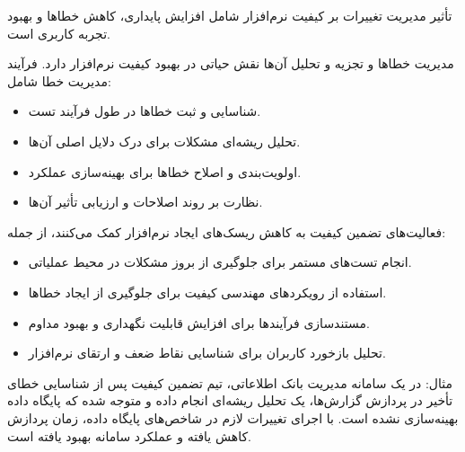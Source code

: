 تأثیر مدیریت تغییرات بر کیفیت نرم‌افزار شامل افزایش پایداری، کاهش خطاها و بهبود تجربه کاربری است.

{مدیریت خطاها و تجزیه و تحلیل آن‌ها} نقش حیاتی در بهبود کیفیت نرم‌افزار دارد. فرآیند مدیریت خطا شامل:
\begin{itemize}
    \item شناسایی و ثبت خطاها در طول فرآیند تست.
    \item تحلیل ریشه‌ای مشکلات برای درک دلایل اصلی آن‌ها.
    \item اولویت‌بندی و اصلاح خطاها برای بهینه‌سازی عملکرد.
    \item نظارت بر روند اصلاحات و ارزیابی تأثیر آن‌ها.
\end{itemize}

فعالیت‌های تضمین کیفیت به کاهش ریسک‌های ایجاد نرم‌افزار کمک می‌کنند، از جمله:
\begin{itemize}
    \item انجام تست‌های مستمر برای جلوگیری از بروز مشکلات در محیط عملیاتی.
    \item استفاده از رویکردهای مهندسی کیفیت برای جلوگیری از ایجاد خطاها.
    \item مستندسازی فرآیندها برای افزایش قابلیت نگهداری و بهبود مداوم.
    \item تحلیل بازخورد کاربران برای شناسایی نقاط ضعف و ارتقای نرم‌افزار.
\end{itemize}

{مثال}: در یک سامانه مدیریت بانک اطلاعاتی، تیم تضمین کیفیت پس از شناسایی خطای تأخیر در پردازش گزارش‌ها، یک تحلیل ریشه‌ای انجام داده و متوجه شده که پایگاه داده بهینه‌سازی نشده است. با اجرای تغییرات لازم در شاخص‌های پایگاه داده، زمان پردازش کاهش یافته و عملکرد سامانه بهبود یافته است.
